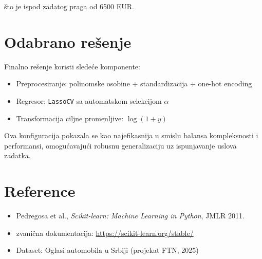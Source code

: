 \documentclass[a4paper,12pt]{article}
\begin{document}
što je ispod zadatog praga od 6500 EUR.

\section{Odabrano rešenje}

Finalno rešenje koristi sledeće komponente:
\begin{itemize}
    \item Preprocesiranje: polinomske osobine + standardizacija + one-hot encoding
    \item Regresor: \texttt{LassoCV} sa automatskom selekcijom $\alpha$
    \item Transformacija ciljne promenljive: $\log(1 + y)$
\end{itemize}

Ova konfiguracija pokazala se kao najefikasnija u smislu balansa kompleksnosti i performansi, omogućavajući robusnu generalizaciju uz ispunjavanje uslova zadatka.

\section*{Reference}

\begin{itemize}
    \item Pedregosa et al., \textit{Scikit-learn: Machine Learning in Python}, JMLR 2011.
    \item zvanična dokumentacija: \url{https://scikit-learn.org/stable/}
    \item Dataset: Oglasi automobila u Srbiji (projekat FTN, 2025)
\end{itemize}
\end{document}
